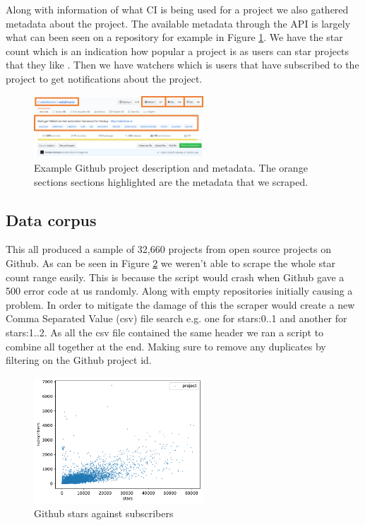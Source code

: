 \documentclass[10pt,conference]{IEEEtran}
\begin{document}
Along with information of what CI is being used for a project we also gathered metadata about the project. The available metadata through the API is largely what can been seen on a repository for example in Figure \ref{ExampleGithubMetaData}. We have the star count which is an indication how popular a project is as users can star projects that they like \citet{Borges2016}. Then we have watchers which is users that have subscribed to the project to get notifications about the project. 

\begin{figure}[h]
  \centering
  \includegraphics[scale=0.5, width=2.5in]{readme metadata example.png}
  \caption[alt text]{Example Github project description and metadata\cite{GithubMetaDataExample}. The orange sections sections highlighted are the metadata that we scraped.}
  \label{ExampleGithubMetaData}
\end{figure}

\vspace*{-0.05in}
\subsection{Data corpus}
\label{section:corpus}
\vspace*{-0.05in}
This all produced a sample of 32,660 projects from open source projects on Github. As can be seen in Figure \ref{graph_scatter_stars_vs_subs} we weren't able to scrape the whole star count range easily. This is because the script would crash when Github gave a 500 error code at us randomly. Along with empty repositories initially causing a problem. In order to mitigate the damage of this the scraper would create a new Comma Separated Value (csv) file search e.g. one for stars:0..1 and another for stars:1..2. As all the csv file contained the same header we ran a script to combine all together at the end. Making sure to remove any duplicates by filtering on the Github project id.

\begin{figure}[!htbp]
  \centering
  \includegraphics[width=2.5in]{../src/results/sub vs stars.pdf}
  \caption[alt text]{Github stars against subscribers}
  \label{graph_scatter_stars_vs_subs}
\end{figure}
\end{document}
